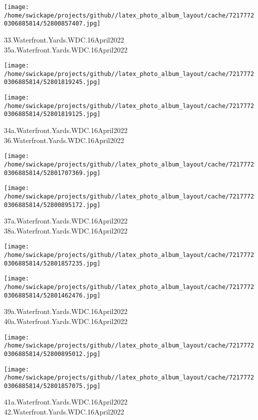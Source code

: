 \documentclass[10pt,letterpaper]{article}
\begin{document}
\vspace{0.25in}
\texttt{[image: /home/swickape/projects/github//latex\_photo\_album\_layout/cache/72177720306885814/52800857407.jpg]}

33.Waterfront.Yards.WDC.16April2022\\
35a.Waterfront.Yards.WDC.16April2022
\pagebreak

\texttt{[image: /home/swickape/projects/github//latex\_photo\_album\_layout/cache/72177720306885814/52801819245.jpg]}

\vspace{0.25in}
\texttt{[image: /home/swickape/projects/github//latex\_photo\_album\_layout/cache/72177720306885814/52801819125.jpg]}

34a.Waterfront.Yards.WDC.16April2022\\
36.Waterfront.Yards.WDC.16April2022
\pagebreak

\texttt{[image: /home/swickape/projects/github//latex\_photo\_album\_layout/cache/72177720306885814/52801707369.jpg]}

\vspace{0.25in}
\texttt{[image: /home/swickape/projects/github//latex\_photo\_album\_layout/cache/72177720306885814/52800895172.jpg]}

37a.Waterfront.Yards.WDC.16April2022\\
38a.Waterfront.Yards.WDC.16April2022
\pagebreak

\texttt{[image: /home/swickape/projects/github//latex\_photo\_album\_layout/cache/72177720306885814/52801857235.jpg]}

\vspace{0.25in}
\texttt{[image: /home/swickape/projects/github//latex\_photo\_album\_layout/cache/72177720306885814/52801462476.jpg]}

39a.Waterfront.Yards.WDC.16April2022\\
40a.Waterfront.Yards.WDC.16April2022
\pagebreak

\texttt{[image: /home/swickape/projects/github//latex\_photo\_album\_layout/cache/72177720306885814/52800895012.jpg]}

\vspace{0.25in}
\texttt{[image: /home/swickape/projects/github//latex\_photo\_album\_layout/cache/72177720306885814/52801857075.jpg]}

41a.Waterfront.Yards.WDC.16April2022\\
42.Waterfront.Yards.WDC.16April2022
\pagebreak
\end{document}
